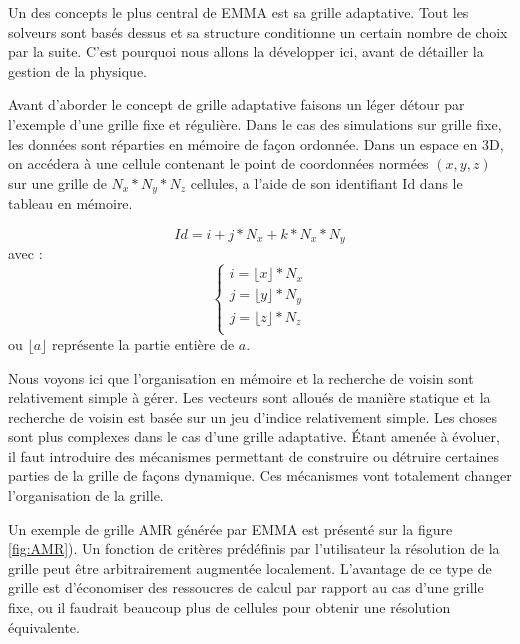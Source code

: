 Un des concepts le plus central de EMMA est sa grille adaptative.
Tout les solveurs sont basés dessus et sa structure conditionne un certain nombre de choix par la suite.
C'est pourquoi nous allons la développer ici, avant de détailler la gestion de la physique. 

Avant d'aborder le concept de grille adaptative faisons un léger détour par l'exemple d'une grille fixe et régulière.
Dans le cas des simulations sur grille fixe, les données sont réparties en mémoire de façon ordonnée.
Dans un espace en 3D, on accédera à une cellule contenant le point de coordonnées normées $(x,y,z)$ sur une grille de $N_x*N_y*N_z$ cellules, a l'aide de son identifiant Id dans le tableau en mémoire.

\begin{equation}
Id = i + j*N_x + k * N_x*N_y
\end{equation}
avec :
\begin{equation}
\begin{cases}
i=\lfloor x \rfloor *N_x \\
j=\lfloor y \rfloor*N_y \\
j=\lfloor z \rfloor*N_z \\
\end{cases}
\end{equation}
ou $\lfloor a \rfloor$ représente la partie entière de $a$.

Nous voyons ici que l'organisation en mémoire et la recherche de voisin sont relativement simple à gérer.
Les vecteurs sont alloués de manière statique et la recherche de voisin est basée sur un jeu d'indice relativement simple.
Les choses sont plus complexes dans le cas d'une grille adaptative.
Étant amenée à évoluer, il faut introduire des mécanismes permettant de construire ou détruire certaines parties de la grille de façons dynamique.
Ces mécanismes vont totalement changer l'organisation de la grille.

Un exemple de grille \ac{AMR} générée par EMMA est présenté sur la figure \ref{fig:AMR}).
Un fonction de critères prédéfinis par l'utilisateur la résolution de la grille peut être arbitrairement augmentée localement.
L'avantage de ce type de grille est d'économiser des ressoucres de calcul par rapport au cas d'une grille fixe, ou il faudrait beaucoup plus de cellules pour obtenir une résolution équivalente.

